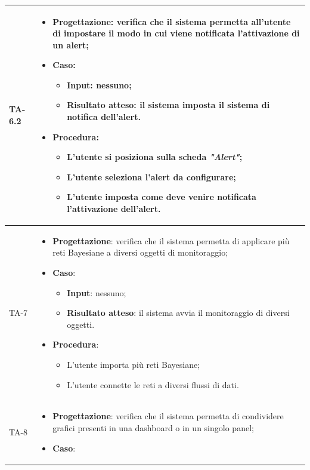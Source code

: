 \begin{longtable}{|C{2.5cm}|C{13cm}|}
\hline
{TA-6.2} &
\begin{itemize}
	\item \textbf{Progettazione}: verifica che il sistema permetta all'utente di impostare il modo in cui viene notificata l'attivazione di un alert;
	\item \textbf{Caso}: 
	\begin{itemize}
		\item \textbf{Input}: nessuno;
		\item \textbf{Risultato atteso}: il sistema imposta il sistema di notifica dell'alert.
	\end{itemize}
	\item \textbf{Procedura}:
	\begin{itemize}
		\item L'utente si posiziona sulla scheda \emph{"Alert"};
		\item L'utente seleziona l'alert da configurare;
		\item L'utente imposta come deve venire notificata l'attivazione dell'alert. 
	\end{itemize} 
\end{itemize} \\
\hline
{TA-7} &
\begin{itemize}
	\item \textbf{Progettazione}: verifica che il sistema permetta di applicare più reti Bayesiane a diversi oggetti di monitoraggio;
	\item \textbf{Caso}: 
	\begin{itemize}
		\item \textbf{Input}: nessuno;
		\item \textbf{Risultato atteso}: il sistema avvia il monitoraggio di diversi oggetti.
	\end{itemize}
	\item \textbf{Procedura}:
	\begin{itemize}
		\item L'utente importa più reti Bayesiane;
		\item L'utente connette le reti a diversi flussi di dati.
	\end{itemize} 
\end{itemize} \\
\hline
{TA-8} &
\begin{itemize}
	\item \textbf{Progettazione}: verifica che il sistema permetta di condividere grafici presenti in una dashboard o in un singolo panel;
	\item \textbf{Caso}: 

\end{itemize}
\end{longtable}
